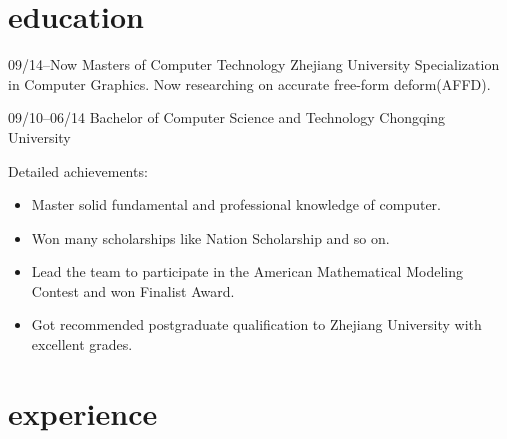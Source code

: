\documentclass[]{friggeri-cv} %
\begin{document}
\section{education}
\begin{entrylist}


\entry
{09/14--Now}
{Masters {\normalfont of Computer Technology}}
{Zhejiang University}
{Specialization in Computer Graphics. Now researching on accurate free-form deform(AFFD).}


\entry
{09/10--06/14}
{Bachelor {\normalfont of Computer Science and Technology}}
{Chongqing University}
{ Detailed achievements:
    \begin{itemize}
    \item Master solid fundamental and professional knowledge of computer.
    \item Won many scholarships like Nation Scholarship and so on.
    \item Lead the team to participate in the American Mathematical Modeling Contest and won Finalist Award.
    \item Got recommended postgraduate qualification to Zhejiang University with excellent grades.
\end{itemize}}


\end{entrylist}


\section{experience}
\end{document}
